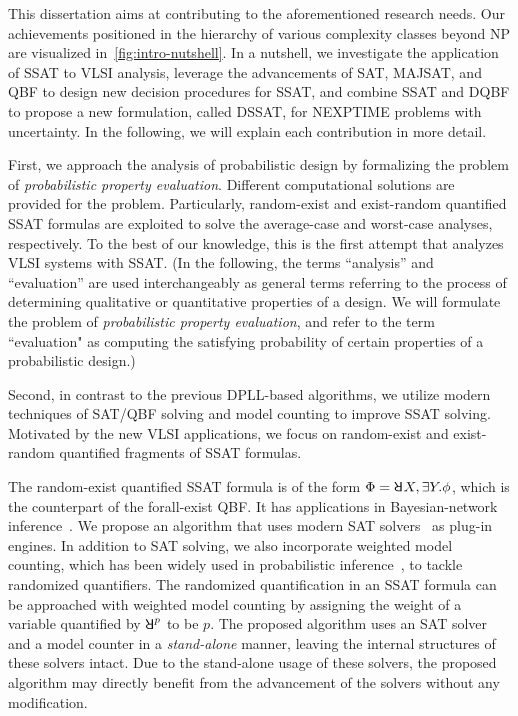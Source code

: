 This dissertation aims at contributing to the aforementioned research needs.
Our achievements positioned in the hierarchy of various complexity classes beyond NP are visualized in~\cref{fig:intro-nutshell}.
In a nutshell, we investigate the application of SSAT to VLSI analysis,
leverage the advancements of SAT, MAJSAT, and QBF to design new decision procedures for SSAT,
and combine SSAT and DQBF to propose a new formulation, called DSSAT, for NEXPTIME problems with uncertainty.
In the following, we will explain each contribution in more detail.

First, we approach the analysis of probabilistic design by
formalizing the problem of \textit{probabilistic property evaluation}.
Different computational solutions are provided for the problem.
Particularly, random-exist and exist-random quantified SSAT formulas are exploited
to solve the average-case and worst-case analyses, respectively.
To the best of our knowledge,
this is the first attempt that analyzes VLSI systems with SSAT.
(In the following,
the terms ``analysis'' and ``evaluation'' are used interchangeably as general terms
referring to the process of determining qualitative or quantitative properties of a design.
We will formulate the problem of \textit{probabilistic property evaluation},
and refer to the term ``evaluation" as computing the satisfying probability of
certain properties of a probabilistic design.)

Second, in contrast to the previous DPLL-based algorithms,
we utilize modern techniques of SAT/QBF solving and model counting to improve SSAT solving.
Motivated by the new VLSI applications,
we focus on random-exist and exist-random quantified fragments of SSAT formulas.

The random-exist quantified SSAT formula is of the form $\Qf=\random{}X,\exists Y.\pf$,
which is the counterpart of the forall-exist QBF.
It has applications in Bayesian-network inference~\cite{Cooper1990,Bacchus2003}.
We propose an algorithm that uses modern SAT solvers~\cite{Een2003Solver,Een2003Incremental} as plug-in engines.
In addition to SAT solving,
we also incorporate weighted model counting,
which has been widely used in probabilistic inference~\cite{Sang2005BayesianInference,Chavira2008},
to tackle randomized quantifiers.
The randomized quantification in an SSAT formula can be approached with weighted model counting
by assigning the weight of a variable quantified by $\random{p}$ to be $p$.
The proposed algorithm uses an SAT solver and a model counter in a \textit{stand-alone} manner,
leaving the internal structures of these solvers intact.
Due to the stand-alone usage of these solvers,
the proposed algorithm may directly benefit from the advancement of the solvers without any modification.

